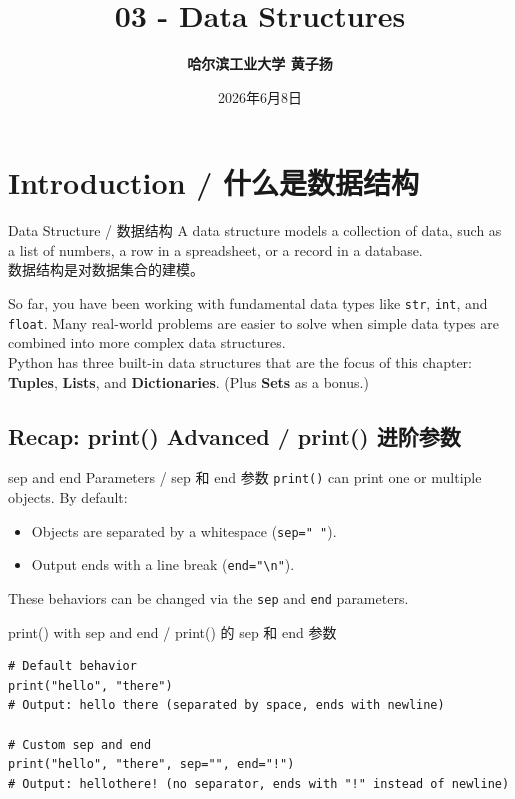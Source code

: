 \documentclass[11pt,a4paper]{article}
\title{\Huge \bfseries 03 - Data Structures}
\author{\Large \textbf{哈尔滨工业大学 \quad 黄子扬}}
\date{2026年6月8日}
\begin{document}
\maketitle
\tableofcontents
\newpage

\section{Introduction / 什么是数据结构}

\begin{concept}{Data Structure / 数据结构}
    A data structure models a collection of data, such as a list of numbers, a row in a spreadsheet, or a record in a database. \\
    数据结构是对数据集合的建模。

    So far, you have been working with fundamental data types like \texttt{str}, \texttt{int}, and \texttt{float}. Many real-world problems are easier to solve when simple data types are combined into more complex data structures. \\
    Python has three built-in data structures that are the focus of this chapter: \textbf{Tuples}, \textbf{Lists}, and \textbf{Dictionaries}. (Plus \textbf{Sets} as a bonus.)
\end{concept}

\subsection{Recap: print() Advanced / print() 进阶参数}

\begin{concept}{sep and end Parameters / sep 和 end 参数}
    \texttt{print()} can print one or multiple objects. By default:
    \begin{itemize}
        \item Objects are separated by a whitespace (\texttt{sep=" "}).
        \item Output ends with a line break (\texttt{end="\textbackslash n"}).
    \end{itemize}
    These behaviors can be changed via the \texttt{sep} and \texttt{end} parameters.
\end{concept}

\begin{examplebox}{print() with sep and end / print() 的 sep 和 end 参数}
\begin{lstlisting}
# Default behavior
print("hello", "there")
# Output: hello there (separated by space, ends with newline)

# Custom sep and end
print("hello", "there", sep="", end="!")
# Output: hellothere! (no separator, ends with "!" instead of newline)
\end{lstlisting}
\end{examplebox}
\end{document}
